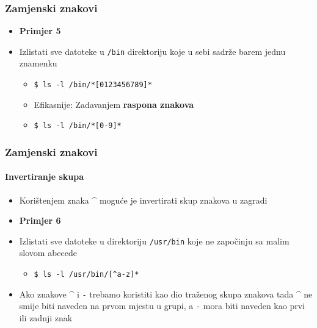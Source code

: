 \documentclass[table,usenames,dvipsnames]{beamer}
\newcommand{\shell}[1]{\texttt{#1}}
\begin{document}
\begin{frame}[t]
\frametitle{Zamjenski znakovi}
\begin{itemize}
	\item \textbf{Primjer 5}
	\item[] Izlistati sve datoteke u \shell{/bin} direktoriju koje u sebi 
        sadrže barem jednu znamenku
  \begin{itemize}
    \item[] \shell{\$ ls -l /bin/*[0123456789]*}
    \item Efikasnije: Zadavanjem \textbf{raspona znakova}
    \item[] \shell{\$ ls -l /bin/*[0-9]*}
  \end{itemize}
\end{itemize}
\vfill
\end{frame}

\begin{frame}[t]
\frametitle{Zamjenski znakovi}
\framesubtitle{Invertiranje skupa}
\begin{itemize}
  \item Korištenjem znaka \textasciicircum{} moguće je invertirati skup 
        znakova u zagradi 
\end{itemize}
\vfill
\begin{itemize}
\item \textbf{Primjer 6}
  \item[] Izlistati sve datoteke u direktoriju \shell{/usr/bin} koje ne 
        započinju sa malim slovom abecede
  \begin{itemize}
    \item[] \shell{\$ ls -l /usr/bin/[\textasciicircum{}a-z]*}
  \end{itemize}
\end{itemize}
\vfill
\begin{itemize}
  \item Ako znakove \textasciicircum{} i \shell{-} trebamo koristiti kao dio traženog skupa znakova tada \textasciicircum{} ne smije biti naveden na prvom mjestu u grupi, a \shell{-} mora biti naveden kao prvi ili zadnji znak
\end{itemize}
\end{frame}
\end{document}
